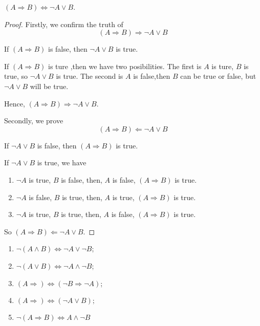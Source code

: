 \begin{question}
    $(A \Rightarrow B)\Leftrightarrow\lnot A \vee B$.
\end{question}
\begin{proof}
    Firstly, we confirm the truth of \[(A \Rightarrow B)\Rightarrow\lnot A \vee B\]

    If $(A \Rightarrow B)$ is false, then $\lnot A \vee B$ is true.

    If $(A \Rightarrow B)$ is ture ,then we have two posibilities. The first is $A$ is ture, $B$ is true, so $\lnot A \vee B$ is true. The second is $A$ is false,then $B$ can be true or false, but $\lnot A \vee B$ will be true.

    Hence, $(A \Rightarrow B)\Rightarrow\lnot A \vee B$.

    Secondly, we prove \[(A \Rightarrow B)\Leftarrow\lnot A \vee B\]

    If $\lnot A \vee B$ is false, then $(A \Rightarrow B)$ is true.

    If $\lnot A \vee B$ is true, we have
    \begin{enumerate}
        \item $\lnot A$ is true, $B$ is false, then, $A$ is false, $(A \Rightarrow B)$ is true.
        \item $\lnot A$ is false, $B$ is true, then, $A$ is true, $(A \Rightarrow B)$ is true.
        \item $\lnot A$ is true, $B$ is true, then, $A$ is false, $(A \Rightarrow B)$ is true.
    \end{enumerate}

    So $(A \Rightarrow B)\Leftarrow\lnot A \vee B$.
\end{proof}

\begin{tips}
    
    \begin{enumerate}
        \item $\lnot(A\wedge B)\Leftrightarrow\lnot A\vee \lnot B$;
        \item $\lnot(A\vee B)\Leftrightarrow\lnot A\wedge \lnot B$;
        \item $(A\Rightarrow)\Leftrightarrow(\lnot B\Rightarrow\lnot A)$;
        \item $(A\Rightarrow)\Leftrightarrow(\lnot A\vee B);$
        \item $\lnot(A\Rightarrow B)\Leftrightarrow A\wedge\lnot B$
    \end{enumerate}
\end{tips}